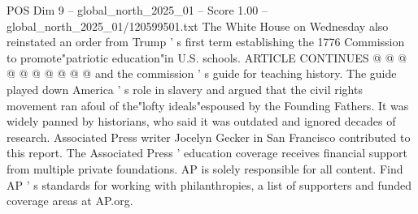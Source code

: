 \begin{textsample}{POS Dim 9 – global\_north\_2025\_01 – Score 1.00 – global\_north\_2025\_01/120599501.txt}
The White House on Wednesday also reinstated an order from Trump ' s first term establishing the 1776 Commission to promote"patriotic education"in U.S. schools.
ARTICLE CONTINUES @ @ @ @ @ @ @ @ @ @ and the commission ' s guide for teaching history.
The guide played down America ' s role in slavery and argued that the civil rights movement ran afoul of the"lofty ideals"espoused by the Founding Fathers.
It was widely panned by historians, who said it was outdated and ignored decades of research.
Associated Press writer Jocelyn Gecker in San Francisco contributed to this report.
The Associated Press ' education coverage receives financial support from multiple private foundations.
AP is solely responsible for all content.
Find AP ' s standards for working with philanthropies, a list of supporters and funded coverage areas at AP.org.

\end{textsample}
